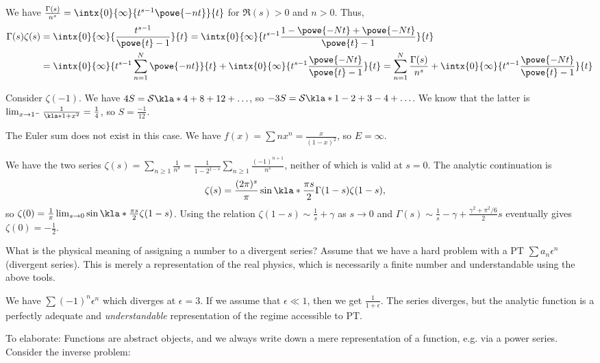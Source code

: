 \documentclass[english, parskip=full]{scrbook}
\newcommand{\definition}[2]{\begin{tcolorbox}[colback=colorbackgrounddefinition,colframe=colordefinition, breakable,enhanced,title=\textbf{#1}.]#2\end{tcolorbox}}
\newcommand{\note}[1]{\begin{tcolorbox}[colback=colorbackgroundnote,colframe=colornote, breakable,enhanced]#1\end{tcolorbox}}
\newcommand{\example}[3]{\begin{tcolorbox}[colback=colorbackgroundexample,colframe=colorexample, breakable,enhanced,title={\textbf{#1}: #2.}]#3\end{tcolorbox}}
\begin{document}
\example{Riemann Zeta Function}{integral representation}{
We have $\frac{\Gamma(s)}{n^{s}} = \intx{0}{\infty}{t^{s-1}\powe{-nt}}{t}$ for $\Re(s)>0$ and $n>0$.
Thus,
\begin{align}
\Gamma(s)\zeta(s) &= \intx{0}{\infty}{\frac{t^{s-1}}{\powe{t}-1}}{t} = \intx{0}{\infty}{t^{s-1}\frac{1 - \powe{-Nt} + \powe{-Nt}}{\powe{t}-1}}{t}\\
&= \intx{0}{\infty}{t^{s-1} \sum_{n=1}^N \powe{-nt}}{t} + \intx{0}{\infty}{t^{s-1}\frac{\powe{-Nt}}{\powe{t}-1}}{t} = \sum_{n=1}^N \frac{\Gamma(s)}{n^s} + \intx{0}{\infty}{t^{s-1}\frac{\powe{-Nt}}{\powe{t}-1}}{t}
\end{align}
}
\definition{Ramanujan Summation}{
Consider $\zeta(-1)$.
We have $4S=\mathcal{S}\kla*{4+8+12+\dots}$, so $-3S = \mathcal{S}\kla*{1-2+3-4+\dots}$.
We know that the latter is $\lim_{x\rightarrow 1^-} \frac{1}{\kla*{1+x}^2} = \frac{1}{4}$, so $S=\frac{-1}{12}$.
\note{
The Euler sum does not exist in this case.
We have $f(x)=\sum nx^n = \frac{x}{(1-x)^2}$, so $E=\infty$.
}
}
\definition{Zeta function Regularization}{
We have the two series $\zeta(s) = \sum_{n\ge 1} \frac{1}{n^s} = \frac{1}{1 - 2^{1-s}} \sum_{n\ge 1} \frac{(-1)^{n+1}}{n^s}$, neither of which is valid at $s=0$.
The analytic continuation is
\begin{align}
\zeta(s) &= \frac{(2\pi)^s}{\pi} \sin\kla*{\frac{\pi s}{2}} \Gamma(1-s) \zeta(1-s),
\end{align}
so $\zeta(0) = \frac{1}{\pi} \lim_{s\rightarrow 0} \sin\kla*{\frac{\pi s}{2}} \zeta(1-s)$.
Using the relation $\zeta(1-s) \sim \frac{1}{s} + \gamma$ as $s\rightarrow 0$ and $\Gamma(s) \sim \frac{1}{s} - \gamma + \frac{\gamma^2+\pi^2/6}{2}s$ eventually gives $\zeta(0) = -\frac{1}{2}$.
}
What is the physical meaning of assigning a number to a divergent series?
Assume that we have a hard problem with a PT $\sum a_n \epsilon^n$ (divergent series).
This is merely a representation of the real physics, which is necessarily a finite number and understandable using the above tools.
\example{A true physical answer}{$\frac{1}{4}$}{
We have $\sum (-1)^n \epsilon^n$ which diverges at $\epsilon=3$.
If we assume that $\epsilon\ll 1$, then we get $\frac{1}{1+\epsilon}$.
The series diverges, but the analytic function is a perfectly adequate and \emph{understandable} representation of the regime accessible to PT.
}
To elaborate: Functions are abstract objects, and we always write down a mere representation of a function, e.g. via a power series.
Consider the inverse problem:
\end{document}
